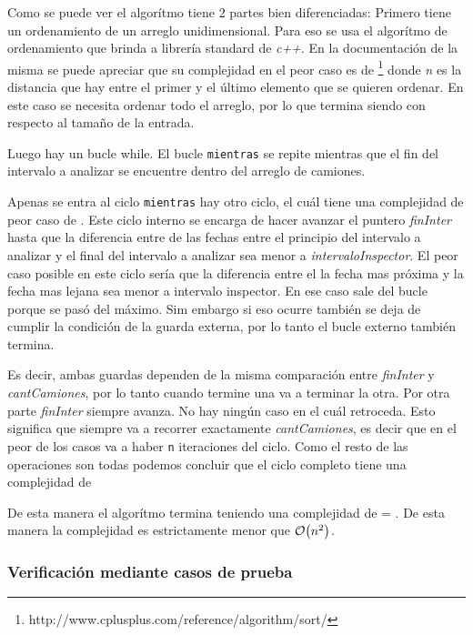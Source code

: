 \documentclass[11pt, a4paper, twoside]{article}
\begin{document}
Como se puede ver el algorítmo tiene 2 partes bien diferenciadas: Primero tiene
un ordenamiento de un arreglo unidimensional. Para eso se usa el algorítmo de
ordenamiento que brinda a librería standard de \textit{c++}. En la documentación
de la misma se puede apreciar que su complejidad en el peor caso es de \footnote{http://www.cplusplus.com/reference/algorithm/sort/} donde
\textit{n} es la distancia que hay entre el primer y el último elemento que se
quieren ordenar. En este caso se necesita ordenar todo el arreglo, por lo que
termina siendo  con respecto al tamaño de la entrada.

Luego hay un bucle while. El bucle \texttt{mientras} se repite mientras que el
fin del intervalo a analizar se encuentre dentro del arreglo de camiones.

Apenas se entra al ciclo \texttt{mientras} hay otro ciclo, el cuál tiene una
complejidad de peor caso de . Este ciclo interno se encarga de hacer
avanzar el puntero \textit{finInter} hasta que la diferencia entre de las fechas
entre el principio del intervalo a analizar y el final del intervalo a analizar
sea menor a \textit{intervaloInspector}. El peor caso posible en este ciclo
sería que la diferencia entre el la fecha mas próxima y la fecha mas lejana sea
menor a intervalo inspector. En ese caso sale del bucle porque se pasó del
máximo. Sim embargo si eso ocurre también se deja de cumplir la condición de la
guarda externa, por lo tanto el bucle externo también termina.


Es decir, ambas guardas dependen de la misma comparación entre \textit{finInter}
y \textit{cantCamiones}, por lo tanto cuando termine una va a terminar la otra.
Por otra parte \textit{finInter} siempre avanza. No hay ningún caso en el cuál
retroceda. Esto significa que siempre va a recorrer exactamente
\textit{cantCamiones}, es decir que en el peor de los casos va a haber
\texttt{n} iteraciones del ciclo. Como el resto de las operaciones son todas
 podemos concluir que el ciclo completo tiene una complejidad de


De esta manera el algorítmo termina teniendo una complejidad de  = . De esta manera la complejidad es estrictamente menor que
$\mathop{}\mathopen{}\mathcal{O}\mathopen{}\left(n^{2}\right)$.



\subsubsection{Verificación mediante casos de prueba}
\end{document}

